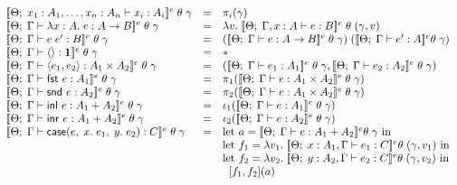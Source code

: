 \begin{figure}
\begin{displaymath}
  \begin{array}{lcl}
    \interpE{\judgeE{x_1:A_1, \ldots, x_n:A_n}{x_i}{A_i}}\;\theta\;\gamma
       & = & \pi_i(\gamma)
    \\
    \interpE{\judgeE{\Gamma}{\fun{x}{A}{e}}{A \to B}}\;\theta\;\gamma
       & = & \semfun{v}{\interpE{\judgeE{\Gamma, x:A}{e}{B}}\;\theta\;(\gamma, v)} \\
    \interpE{\judgeE{\Gamma}{e\;e'}{B}}\;\theta\;\gamma
       & = & 
       (\interpE{\judgeE{\Gamma}{e}{A\to B}}\;\theta\;\gamma)\;
       (\interpE{\judgeE{\Gamma}{e'}{A}}\theta\;\gamma)
    \\
    \interpE{\judgeE{\Gamma}{\unit}{\unittype}}\;\theta\;\gamma
       & = & 
       *
    \\
    \interpE{\judgeE{\Gamma}{\pair{e_1}{e_2}}{A_1\times A_2}}\;\theta\;\gamma
       & = & 
          \sempair{\interpE{\judgeE{\Gamma}{e_1}{A_1}}\;\theta\;\gamma}
                  {\interpE{\judgeE{\Gamma}{e_2}{A_2}}\;\theta\;\gamma}
    \\
    \interpE{\judgeE{\Gamma}{\fst{e}}{A_1}}\;\theta\;\gamma
       & = & 
       \pi_1(\interpE{\judgeE{\Gamma}{e}{A_1\times A_2}}\;\theta\;\gamma)
    \\
    \interpE{\judgeE{\Gamma}{\snd{e}}{A_2}}\;\theta\;\gamma
       & = & 
       \pi_2(\interpE{\judgeE{\Gamma}{e}{A_1\times A_2}}\;\theta\;\gamma)
    \\
    \interpE{\judgeE{\Gamma}{\inl{e}}{A_1+A_2}}\;\theta\;\gamma 
       & = & 
       \iota_1(\interpE{\judgeE{\Gamma}{e}{A_1}}\;\theta\;\gamma)
    \\
    \interpE{\judgeE{\Gamma}{\inr{e}}{A_1+A_2}}\;\theta\;\gamma 
       & = & 
       \iota_2 (\interpE{\judgeE{\Gamma}{e}{A_2}}\;\theta\;\gamma)
    \\
    \interpE{\judgeE{\Gamma}{\Case{e}{x}{e_1}{y}{e_2}}{C}}\;\theta\;\gamma
       & = & 
          \mbox{let } a = \interpE{\judgeE{\Gamma}{e}{A_1 + A_2}}\theta\;\gamma
          \mbox{ in}\\
       &   & 
          \mbox{let } f_1 = \semfun{v_1}{\interpE{\judgeE{x:A_1, \Gamma}{e_1}{C}}\theta\;(\gamma, v_1)}
          \mbox{ in}\\
       &   & 
          \mbox{let } f_2 = \semfun{v_2}{\interpE{\judgeE{y:A_2, \Gamma}{e_2}{C}}\theta\;(\gamma, v_2)} 
          \mbox{ in}\\
       &   &\;\;
           [f_1, f_2](a)
    \\

\end{array}
\end{displaymath}
\end{figure}
